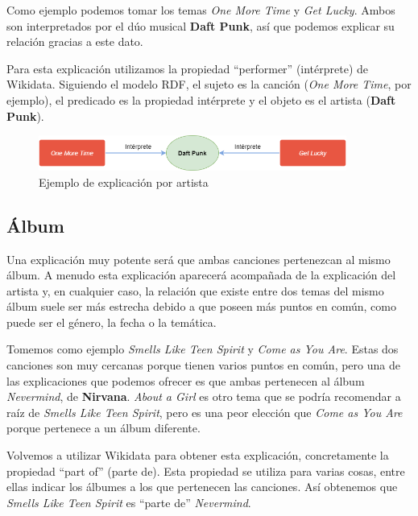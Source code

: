 Como ejemplo podemos tomar los temas \textit{One More Time} y \textit{Get Lucky}. Ambos son interpretados por el dúo musical \textbf{Daft Punk}, así que podemos explicar su relación gracias a este dato.

Para esta explicación utilizamos la propiedad ``performer'' (intérprete) de Wikidata. Siguiendo el modelo RDF, el sujeto es la canción (\textit{One More Time}, por ejemplo), el predicado es la propiedad intérprete y el objeto es el artista (\textbf{Daft Punk}). \\

\begin{figure}[h!]
	\centering
	\includegraphics[width = 0.9\textwidth]{Imagenes/Bitmap/Artista ejemplo.png}
	\caption{Ejemplo de explicación por artista}
	\label{fig:sampleImage}
\end{figure}

\subsection*{Álbum}

Una explicación muy potente será que ambas canciones pertenezcan al mismo álbum. A menudo esta explicación aparecerá acompañada de la explicación del artista y, en cualquier caso, la relación que existe entre dos temas del mismo álbum suele ser más estrecha debido a que poseen más puntos en común, como puede ser el género, la fecha o la temática.

Tomemos como ejemplo \textit{Smells Like Teen Spirit} y \textit{Come as You Are}. Estas dos canciones son muy cercanas porque tienen varios puntos en común, pero una de las explicaciones que podemos ofrecer es que ambas pertenecen al álbum \textit{Nevermind}, de \textbf{Nirvana}. \textit{About a Girl} es otro tema que se podría recomendar a raíz de \textit{Smells Like Teen Spirit}, pero es una peor elección que \textit{Come as You Are} porque pertenece a un álbum diferente.

Volvemos a utilizar Wikidata para obtener esta explicación, concretamente la propiedad ``part of'' (parte de). Esta propiedad se utiliza para varias cosas, entre ellas indicar los álbumes a los que pertenecen las canciones. Así obtenemos que \textit{Smells Like Teen Spirit} es ``parte de'' \textit{Nevermind}.\\

